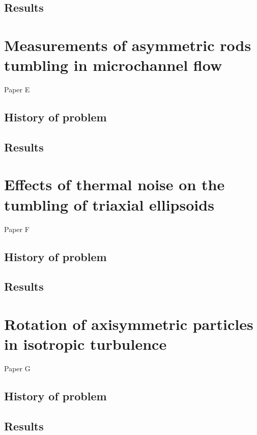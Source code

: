 \documentclass[thesis.tex]{subfiles}
\begin{document}
\section{Results}

\chapter{Measurements of asymmetric rods tumbling in microchannel flow}
Paper E
\section{History of problem}
\section{Results}
\chapter{Effects of thermal noise on the tumbling of triaxial ellipsoids}
Paper F
\section{History of problem}
\section{Results}
\chapter{Rotation of axisymmetric particles in isotropic turbulence}
Paper G
\section{History of problem}
\section{Results}
\end{document}
